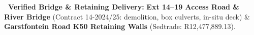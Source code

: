 \vfill

\noindent
\begin{tcolorbox}[enhanced, colback=white, colframe=mhnavy, boxrule=0.8pt, arc=3pt, left=8pt, right=8pt, top=6pt, bottom=6pt, drop shadow=black!3]
    {\fontsize{8pt}{10.6pt}\selectfont\color{mhnavy}\bfseries\faCheckCircle\ Verified Bridge \& Retaining Delivery:}\quad
    {\fontsize{8pt}{10.6pt}\selectfont\color{mhtext}
    \textbf{Ext 14--19 Access Road \& River Bridge} (Contract 14-2024/25: demolition, box culverts, in-situ deck) \& \textbf{Garstfontein Road K50 Retaining Walls} (Sedtrade: R12,477,889.13).
    }
\end{tcolorbox}

\clearpage
